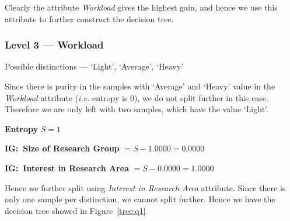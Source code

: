 \documentclass[a4paper,11pt]{article}
\begin{document}
\begin{mlsolution}
\begin{addmargin}{1.5em}
\begin{addmargin}{1.5em}
            Clearly the attribute \textit{Workload} gives the highest gain, and hence we use this attribute to further construct the decision tree.

        \end{addmargin}

        \subsubsection{Level 3 --- Workload}
        \begin{addmargin}{1.5em}

            Possible distinctions --- `Light', `Average', `Heavy' \br%

            Since there is purity in the samples with `Average' and `Heavy' value in the \textit{Workload} attribute (\textit{i.e.} entropy is 0), we do not split further in this case. Therefore we are only left with two samples, which have the value `Light'. \br%

            \textbf{Entropy} $S = 1$ \br%

            \textbf{IG:\ Size of Research Group} $ = S - 1.0000 = 0.0000$

            \textbf{IG:\ Interest in Research Area} $ = S - 0.0000 = 1.0000$ \br%

            Hence we further split using \textit{Interest in Research Area} attribute. Since there is only one sample per distinction, we cannot split further. Hence we have the decision tree showed in Figure~\ref{tree:q1}

        \end{addmargin}

    \end{addmargin}

\end{mlsolution}
\end{document}

